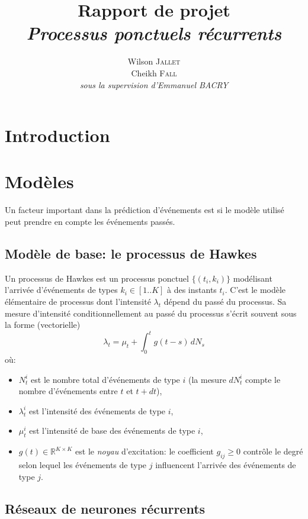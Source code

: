 \documentclass[11pt]{article}
\title{\textbf{Rapport de projet}\\
  \textit{Processus ponctuels récurrents}
}
\author{
  Wilson \textsc{Jallet}\\
  Cheikh \textsc{Fall}\\
  \textit{sous la supervision d'Emmanuel BACRY}
}
\newcommand{\RR}{\mathbb{R}}
\begin{document}
\maketitle

\section{Introduction}


\section{Modèles}

Un facteur important dans la prédiction d'événements est si le modèle utilisé peut prendre en compte les événements passés.

\subsection{Modèle de base: le processus de Hawkes}

Un processus de Hawkes est un processus ponctuel $\{(t_i, k_i)\}$ modélisant l'arrivée d'événements de types $k_i\in[1..K]$ à des instants $t_i$. C'est le modèle élémentaire de processus dont l'intensité $\lambda_t$ dépend du passé du processus. Sa mesure d'intensité conditionnellement au passé du processus s'écrit souvent sous la forme (vectorielle)
\begin{equation}
	\lambda_t = \mu_t + \int_0^t g(t-s)\,dN_s
\end{equation}
où:\begin{itemize}
	\item $N^i_t$ est le nombre total d'événements de type $i$ (la mesure $dN^i_t$ compte le nombre d'événements entre $t$ et $t+dt$),
	\item $\lambda_t^i$ est l'intensité des événements de type $i$,
	\item $\mu^i_t$ est l'intensité de base des événements de type $i$,
	\item $g(t) \in \RR^{K\times K}$ est le \textit{noyau} d'excitation: le coefficient $g_{ij} \geq 0$ contrôle le degré selon lequel les événements de type $j$ influencent l'arrivée des événements de type $j$.
\end{itemize} 

\subsection{Réseaux de neurones récurrents}
\end{document}
